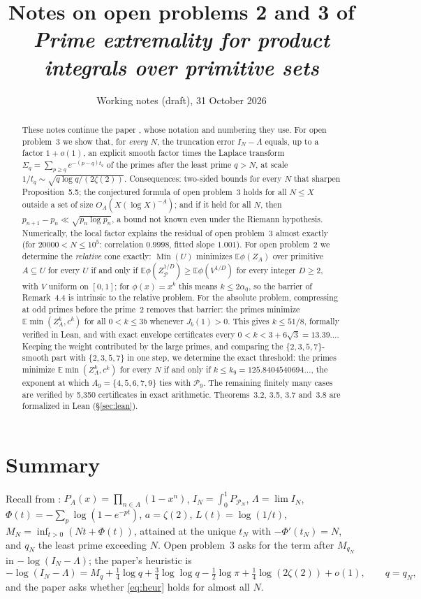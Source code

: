 \documentclass[11pt]{article}
\title{Notes on open problems 2 and 3 of\\
\emph{Prime extremality for product integrals over primitive sets}}
\author{Working notes (draft), 31 October 2026}
\date{}
\theoremstyle{remark}
\newcommand{\Prm}{\mathcal{P}}
\newcommand{\E}{\mathbb{E}}
\newcommand{\Min}{\operatorname{Min}}
\begin{document}
\maketitle

\begin{abstract}
These notes continue the paper \cite{P}, whose notation and numbering
they use. For open problem~3 we show that, for \emph{every} $N$, the truncation error
$I_N-\Lambda$ equals, up to a factor $1+o(1)$, an explicit smooth factor times the
Laplace transform $\Sigma_q=\sum_{p\ge q}e^{-(p-q)t_q}$ of the primes after the least prime
$q>N$, at scale $1/t_q\sim\sqrt{q\log q/(2\zeta(2))}$. Consequences: two-sided bounds for every
$N$ that sharpen Proposition~5.5; the conjectured formula of open problem~3 holds for all
$N\le X$ outside a set of size $O_A(X(\log X)^{-A})$; and if it held for all $N$, then
$p_{n+1}-p_n\ll\sqrt{p_n\log p_n}$, a bound not known even under the Riemann hypothesis.
Numerically, the local factor explains the residual of open problem~3 almost
exactly (for $20000<N\le10^5$: correlation $0.9998$, fitted slope $1.001$).
For open problem~2 we determine the \emph{relative} cone exactly:
$\Min(U)$ minimizes $\E\phi(Z_A)$ over primitive $A\subseteq U$ for every $U$ if and only if
$\E\phi(Z_\Prm^{1/D})\ge\E\phi(V^{1/D})$ for every integer $D\ge2$, with $V$ uniform on
$[0,1]$; for $\phi(x)=x^k$ this means $k\le2\alpha_0$, so the barrier of Remark~4.4 is
intrinsic to the relative problem. For the absolute problem, compressing at odd primes
before the prime~$2$ removes that barrier: the primes minimize
$\E\min(Z_A^k,c^k)$ for all $0<k\le 3b$ whenever $J_b(1)>0$. This gives $k\le 51/8$, formally
verified in Lean, and with exact envelope certificates every $0<k<3+6\sqrt3=13.39\ldots$.
Keeping the weight contributed by the large primes, and comparing the $\{2,3,5,7\}$-smooth part
with $\{2,3,5,7\}$ in one step, we determine the exact threshold: the primes minimize
$\E\min(Z_A^k,c^k)$ for every $N$ if and only if $k\le k_9=125.8404540694\ldots$, the exponent at
which $A_9=\{4,5,6,7,9\}$ ties with $\Prm_9$. The remaining finitely many cases are verified by
5{,}350 certificates in exact arithmetic. Theorems~3.2, 3.5, 3.7 and~3.8 are formalized in Lean
(\S\ref{sec:lean}).
\end{abstract}

\section{Summary}

Recall from \cite{P}: $P_A(x)=\prod_{n\in A}(1-x^n)$, $I_N=\int_0^1P_{\Prm_N}$,
$\Lambda=\lim I_N$, $\Phi(t)=-\sum_p\log(1-e^{-pt})$, $a=\zeta(2)$, $L(t)=\log(1/t)$,
$M_N=\inf_{t>0}(Nt+\Phi(t))$, attained at the unique $t_N$ with $-\Phi'(t_N)=N$, and
$q_N$ the least prime exceeding $N$. Open problem~3 asks for the term after $M_{q_N}$ in
$-\log(I_N-\Lambda)$; the paper's heuristic is
\begin{equation}\label{eq:heur}
-\log(I_N-\Lambda)=M_q+\tfrac14\log q+\tfrac34\log\log q-\tfrac12\log\pi
+\tfrac14\log(2\zeta(2))+o(1),\qquad q=q_N,
\end{equation}
and the paper asks whether \eqref{eq:heur} holds for almost all $N$.
\end{document}
